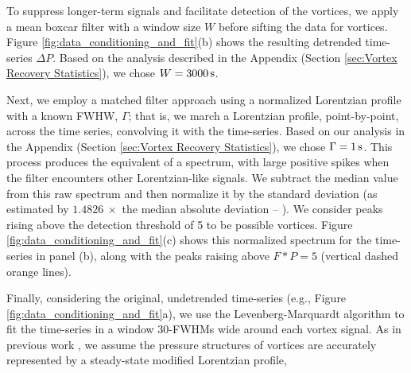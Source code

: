 \documentclass{aastex63}
\begin{document}
To suppress longer-term signals and facilitate detection of the vortices, we apply a mean boxcar filter with a window size $W$ before sifting the data for vortices. Figure \ref{fig:data_conditioning_and_fit}(b) shows the resulting detrended time-series $\Delta P$. Based on the analysis described in the Appendix (Section \ref{sec:Vortex Recovery Statistics}), we chose $W = 3000\,{\rm s}$. 

Next, we employ a matched filter approach \citep[][ch.~13]{Press2007} using a normalized Lorentzian profile with a known FWHW, $\Gamma$; that is, we march a Lorentzian profile, point-by-point, across the time series, convolving it with the time-series. Based on our analysis in the Appendix (Section \ref{sec:Vortex Recovery Statistics}), we chose $\Gamma = 1\,{\rm s}$. This process produces the equivalent of a spectrum, with large positive spikes when the filter encounters other Lorentzian-like signals. We subtract the median value from this raw spectrum and then normalize it by the standard deviation (as estimated by $1.4826\ \times$ the median absolute deviation -- \citealp{doi:10.1080/01621459.1993.10476408}). We consider peaks rising above the detection threshold of 5 to be possible vortices. Figure \ref{fig:data_conditioning_and_fit}(c) shows this normalized spectrum for the time-series in panel (b), along with the peaks raising above $F \ast P = 5$ (vertical dashed orange lines). 

Finally, considering the original, undetrended time-series (e.g., Figure \ref{fig:data_conditioning_and_fit}a), we use the Levenberg-Marquardt algorithm \citep[cf.][]{Press2007} to fit the time-series in a window 30-FWHMs wide around each vortex signal. As in previous work \citep[e.g.,][]{2016JGRE..121.1514K}, we assume the pressure structures of vortices are accurately represented by a steady-state modified Lorentzian profile,
\end{document}
